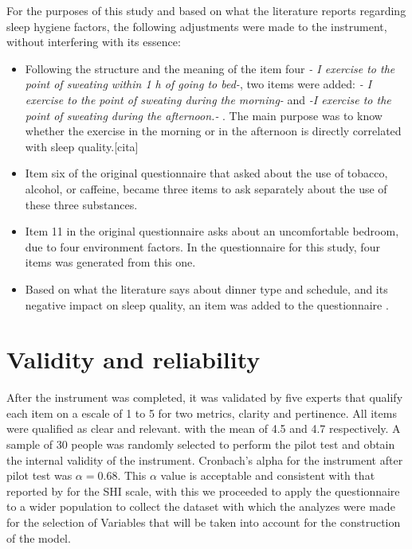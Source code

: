 \documentclass[]{book}
\begin{document}
For the purposes of this study and based on what the literature reports
regarding sleep hygiene factors, the following adjustments were made to
the instrument, without interfering with its essence:

\begin{itemize}
\item
  Following the structure and the meaning of the item four \emph{- I
  exercise to the point of sweating within 1 h of going to bed-}, two
  items were added: \emph{- I exercise to the point of sweating during
  the morning-} and \emph{-I exercise to the point of sweating during
  the afternoon.- }. The main purpose was to know whether the exercise
  in the morning or in the afternoon is directly correlated with sleep
  quality.{[}cita{]}
\item
  Item six of the original questionnaire that asked about the use of
  tobacco, alcohol, or caffeine, became three items to ask separately
  about the use of these three substances.
\item
  Item 11 in the original questionnaire asks about an uncomfortable
  bedroom, due to four environment factors. In the questionnaire for
  this study, four items was generated from this one.
\item
  Based on what the literature says about dinner type and schedule, and
  its negative impact on sleep quality, an item was added to the
  questionnaire
  \citep[Stefano2014,\citet{Irish2015},\citet{Wentz2011}]{Posner2011}.
\end{itemize}

\section{Validity and reliability}\label{validity-and-reliability}

After the instrument was completed, it was validated by five experts
that qualify each item on a escale of 1 to 5 for two metrics, clarity
and pertinence. All items were qualified as clear and relevant. with the
mean of 4.5 and 4.7 respectively. A sample of 30 people was randomly
selected to perform the pilot test and obtain the internal validity of
the instrument. Cronbach's alpha for the instrument after pilot test was
\(\alpha=0.68\). This \(\alpha\) value is acceptable and consistent with
that reported by \citep{mastin2006} for the SHI scale, with this we
proceeded to apply the questionnaire to a wider population to collect
the dataset with which the analyzes were made for the selection of
Variables that will be taken into account for the construction of the
model.
\end{document}
